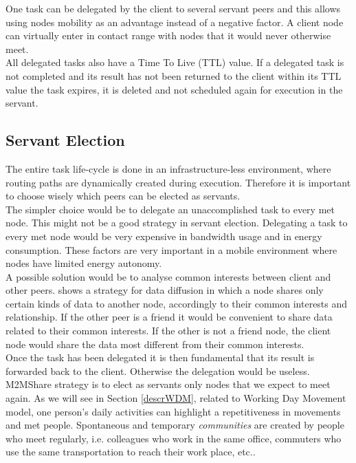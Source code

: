 One task can be delegated by the client to several servant peers and this allows using nodes mobility as an advantage instead of a negative factor. A client node can virtually enter in contact range with nodes that it would never otherwise meet.
\\

All delegated tasks also have a Time To Live (TTL) value. If a delegated task is not completed and its result has not been returned to the client within its TTL value the task expires, it is deleted and not scheduled again for execution in the servant.
\\

\subsection{Servant Election}
The entire task life-cycle is done in an infrastructure-less environment, where routing paths are dynamically created during execution. Therefore it is important to choose wisely which peers can be elected as servants.
\\

The simpler choice would be to delegate an unaccomplished task to every met node. This might not be a good strategy in servant election. Delegating a task to every met node would be very expensive in bandwidth usage and in energy consumption. These factors are very important in a mobile environment where nodes have limited energy autonomy. 
\\

A possible solution would be to analyse common interests between client and other peers. \cite{socialNetworks} shows a strategy for data diffusion in which a node shares only certain kinds of data to another node, accordingly to their common interests and relationship. If the other peer is a friend it would be convenient to share data related to their common interests. If the other is not a friend node, the client node would share the data most different from their common interests.
\\

Once the task has been delegated it is then fundamental that its result is forwarded back to the client. Otherwise the delegation would be useless. M2MShare strategy is to elect as servants only nodes that we expect to meet again. As we will see in Section \ref{descrWDM}, related to Working Day Movement model, one person's daily activities can highlight a repetitiveness in movements and met people. Spontaneous and temporary \textit{communities} are created by people who meet regularly, i.e. colleagues who work in the same office, commuters who use the same transportation to reach their work place, etc..
\\

